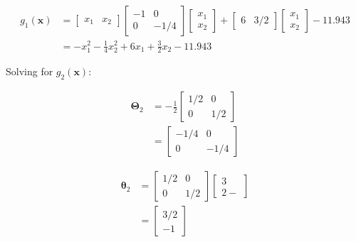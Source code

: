 \documentclass{homeworg}
\begin{document}
\begin{equation}
    \begin{aligned}
        g_1(\bm{x}) &=
        \begin{bmatrix}
            x_1 & x_2
        \end{bmatrix}
        \begin{bmatrix}
            -1 & 0 \\
            0 & -1/4
        \end{bmatrix}
        \begin{bmatrix}
            x_1 \\ x_2
        \end{bmatrix} + 
        \begin{bmatrix}
            6 & 3/2
        \end{bmatrix}
        \begin{bmatrix}
            x_1 \\ x_2
        \end{bmatrix} - 11.943
        \\ &=
        -x_1^2-\frac{1}{4}x_2^2+6x_1+\frac{3}{2}x_2-11.943
    \end{aligned}
\end{equation}


Solving for $g_2(\bm{x})$:

\begin{equation}
    \begin{aligned}
        \bm{\Theta}_2 &= -\frac{1}{2}
        \begin{bmatrix}
            1/2 & 0 \\
            0 & 1/2
        \end{bmatrix}
        \\ &=
        \begin{bmatrix}
            -1/4 & 0 \\
            0 & -1/4
        \end{bmatrix}
    \end{aligned}
\end{equation}

\begin{equation}
    \begin{aligned}
        \bm{\theta}_2 &=
        \begin{bmatrix}
            1/2 & 0 \\
            0 & 1/2
        \end{bmatrix}
        \begin{bmatrix}
            3 \\ 2-
        \end{bmatrix}
        \\ &=
        \begin{bmatrix}
            3/2 \\
            -1
        \end{bmatrix}
    \end{aligned}
\end{equation}
\end{document}
